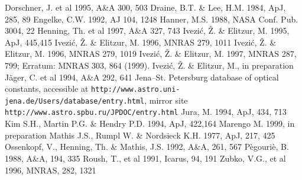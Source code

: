 \documentclass[11pt]{article}
\def\Ivezic {Ivezi\'c}
\begin{document}
\newpage

\begin{thebibliography}{99}
  Dorschner, J. et al 1995, A\&A 300, 503
    Draine, B.T. \& Lee, H.M. 1984, ApJ, 285, 89
  Engelke, C.W. 1992, AJ 104, 1248
  Hanner, M.S. 1988, NASA Conf. Pub. 3004, 22
  Henning, Th. et al 1997, A\&A 327, 743
    \Ivezic, \v Z. \& Elitzur, M. 1995, ApJ, 445,415
   \Ivezic, \v Z. \& Elitzur, M. 1996, MNRAS 279, 1011
   \Ivezic, \v Z. \& Elitzur, M. 1996, MNRAS 279, 1019
    \Ivezic, \v Z. \& Elitzur, M. 1997, MNRAS 287, 799;
                  \newline Erratum: MNRAS 303, 864 (1999).
  \Ivezic, \v Z. \& Elitzur, M., in preparation
  J\"ager, C. et al 1994, A\&A 292, 641
    Jena--St. Petersburg database of optical constants,
                  accessible at \newline
                  {\tt http://www.astro.uni-jena.de/Users/database/entry.html},
                  \newline mirror site
                  {\tt http://www.astro.spbu.ru/JPDOC/entry.html}
    Jura, M. 1994, ApJ, 434, 713
   Kim S.H., Martin P.G. \& Hendry P.D. 1994, ApJ, 422,164
  Marengo M. 1999, in preparation
   Mathis J.S., Rumpl W. \& Nordsieck K.H. 1977, ApJ, 217, 425
   Ossenkopf, V., Henning, Th. \& Mathis, J.S. 1992, A\&A, 261,
                  567
   P\`egouri\`e, B. 1988, A\&A, 194, 335
   Roush, T., et al 1991, Icarus, 94, 191
   Zubko, V.G., et al 1996, MNRAS, 282, 1321

\end{thebibliography}
\end{document}
